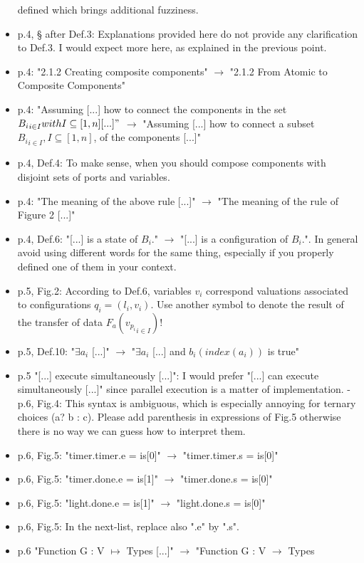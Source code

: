 \begin{itemize}
defined which brings additional fuzziness.
\item p.4, § after Def.3: Explanations provided here do not provide any 
clarification to Def.3. I would expect more here, as explained in the 
previous point.
\item p.4: "2.1.2 Creating composite components" $\rightarrow$ "2.1.2 From Atomic to 
Composite Components"
\item p.4: "Assuming [...] how to connect the components in the set ${B_i}_{i \in 
I} with I \subseteq [1,n] [...]"$ $\rightarrow$ "Assuming [...] how to connect a subset 
${B_i}_{i \in I}, I \subseteq [1,n]$, of the components [...]"
\item p.4, Def.4: To make sense, when you should compose components with disjoint 
sets of ports and variables.
\item p.4: "The meaning of the above rule [...]" $\rightarrow$ "The meaning of the rule of 
Figure 2 [...]"
\item p.4, Def.6: "[...] is a state of $B_i$." $\rightarrow$ "[...] is a configuration of 
$B_i$.". In general avoid using different words for the same thing, especially 
if you properly defined one of them in your context.
\item p.5, Fig.2: According to Def.6, variables $v_i$ correspond valuations 
associated to configurations $q_i = (l_i, v_i)$. Use another symbol to denote 
the result of the transfer of data $F_a({ v_{p_i} }_{i \in I})$!
\item p.5, Def.10: "$\exists a_i$ [...]" $\rightarrow$ "$\exists a_i$ [...] and $b_i(index(a_i))$ is 
true"
\item p.5 "[...] execute simultaneously [...]": I would prefer "[...] can execute 
simultaneously [...]" since parallel execution is a matter of implementation.
- p.6, Fig.4: This syntax is ambiguous, which is especially annoying for 
ternary choices (a? b : c). Please add parenthesis in expressions of Fig.5 
otherwise there is no way we can guess how to interpret them.
\item p.6, Fig.5: "timer.timer.e = is[0]" $\rightarrow$ "timer.timer.s = is[0]"
\item p.6, Fig.5: "timer.done.e = is[1]" $\rightarrow$ "timer.done.s = is[0]"
\item p.6, Fig.5: "light.done.e = is[1]" $\rightarrow$ "light.done.s = is[0]"
\item p.6, Fig.5: In the next-list, replace also ".e" by ".s".
\item p.6 "Function G : V $\mapsto$ Types [...]" $\rightarrow$ "Function G : V $\to$ Types 

\end{itemize}
